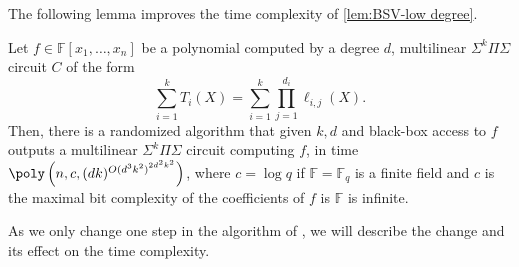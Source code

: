 \documentclass[12pt]{article}
\newcommand{\F}{\mathbb{F}}
\newcommand{\Fn}{\F[x_1,\ldots,x_n]}
\newcommand{\Sps}[1]{\Sigma^{#1} \Pi\Sigma}
\begin{document}
	The following lemma improves the time complexity of \autoref{lem:BSV-low degree}.
	
	\begin{lemma}
		\label{lem:low degree}
		Let $f \in \Fn$ be a polynomial computed by a degree $d$, multilinear $\Sps{k}$ circuit $C$ of the form 
		\begin{equation*}
			\sum\limits_{i = 1}^k T_i(X)= \sum_{i= 1}^k
			\prod_{j=1}^{d_i}\ell_{i,j}(X).
		\end{equation*} 
		Then, there is a randomized algorithm that given $k,d$ and black-box access to $f$ outputs a multilinear $\Sps{k}$ circuit computing $f$, in time $ 	\poly\left(n, c, (dk)^{{O(d^3k^2)}^{2d^2k^2}}\right)$,
		where $c=\log q$ if $\F=\F_q$ is a finite field and $c$ is the maximal bit complexity of the coefficients of $f$ is $\F$ is infinite.		
	\end{lemma}
	
	As we only change one step in the algorithm of \cite{BSV21}, we will describe the change and its effect on the time complexity. 
	
\end{document}
